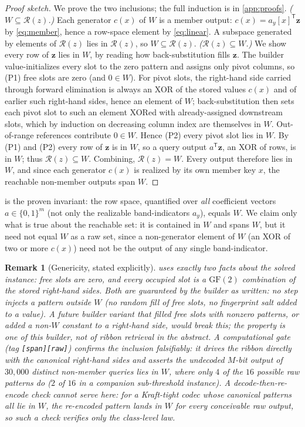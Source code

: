 \documentclass[sigconf,nonacm,anonymous,balance=false]{acmart}
\newtheorem{remark}{Remark}
\newcommand{\B}{\{0,1\}}
\newcommand{\GF}{\mathrm{GF}(2)}
\newcommand{\W}{W}                          %
\newcommand{\Rz}{\mathcal{R}(z)}            %
\newcommand{\bz}{\mathbf{z}}                %
\newcommand{\ay}{a_y}                       %
\newcommand{\cx}{c(x)}                      %
\begin{document}
\begin{proof}[Proof sketch]
We prove the two inclusions; the full induction is in \cref{app:proofs}.
\emph{($\W \subseteq \Rz$.)} Each generator $\cx$ of $\W$ is a member output:
$\cx = \ay[x]^{\mathsf T}\bz$ by \eqref{eq:member}, hence a row-space element by
\eqref{eq:linear}. A subspace generated by elements of $\Rz$ lies in $\Rz$, so
$\W \subseteq \Rz$.
\emph{($\Rz \subseteq \W$.)} We show every row of $\bz$ lies in $\W$, by reading how
back-substitution fills $\bz$. The builder value-initializes every slot to the zero
pattern and assigns only pivot columns, so (P1) free slots are zero (and $0 \in \W$).
For pivot slots, the right-hand side carried through forward elimination is always an
XOR of the stored values $\cx$ and of earlier such right-hand sides, hence an element
of $\W$; back-substitution then sets each pivot slot to such an element XORed with
already-assigned downstream slots, which by induction on decreasing column index are
themselves in $\W$. Out-of-range references contribute $0 \in \W$. Hence (P2) every
pivot slot lies in $\W$. By (P1) and (P2) every row of $\bz$ is in $\W$, so a query
output $a^{\mathsf T}\bz$, an XOR of rows, is in $\W$; thus $\Rz \subseteq \W$.
Combining, $\Rz = \W$. Every output therefore lies in $\W$, and since each generator
$\cx$ is realized by its own member key $x$, the reachable non-member outputs span
$\W$.
\end{proof}

 is the proven invariant: the row space, quantified over
\emph{all} coefficient vectors $a \in \B^m$ (not only the realizable band-indicators
$\ay$), equals $\W$. We claim only what is true about the reachable set: it is
contained in $\W$ and spans $\W$, but it need not equal $\W$ as a raw set, since a
non-generator element of $\W$ (an XOR of two or more $\cx$) need not be the output of
any single band-indicator.

\begin{remark}[Genericity, stated explicitly]
\label{rem:genericity}
 uses exactly two facts about the solved instance: free slots are
zero, and every occupied slot is a $\GF$ combination of the stored right-hand sides.
Both are guaranteed by the builder as written: no step injects a pattern outside $\W$
(no random fill of free slots, no fingerprint salt added to a value). A future builder
variant that filled free slots with nonzero patterns, or added a non-$\W$ constant to
a right-hand side, would break this; the property is one of \emph{this} builder, not
of ribbon retrieval in the abstract. A computational gate (tag
\texttt{[span][raw]}) confirms the inclusion falsifiably: it drives the ribbon directly
with the canonical right-hand sides and asserts the \emph{undecoded} $M$-bit output of
$30{,}000$ distinct non-member queries lies in $\W$, where only $4$ of the $16$ possible
raw patterns do ($2$ of $16$ in a companion sub-threshold instance). A
decode-then-re-encode check cannot serve here: for a Kraft-tight codec whose canonical
patterns all lie in $\W$, the re-encoded pattern lands in $\W$ for \emph{every}
conceivable raw output, so such a check verifies only the class-level law.
\end{remark}
\end{document}
